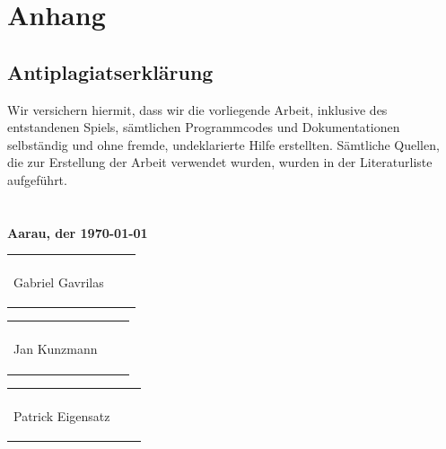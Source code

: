 \documentclass[11pt,a4paper]{scrbook}
\begin{document}
\clearpage
{}
\part{Anhang}
\listoffigures

\clearpage

\printbibliography

\clearpage

\chapter*{Antiplagiatserklärung}
Wir versichern hiermit, dass wir die vorliegende Arbeit, inklusive des entstandenen Spiels, sämtlichen Programmcodes und Dokumentationen
selbständig und ohne fremde, undeklarierte Hilfe erstellten. Sämtliche Quellen, die zur Erstellung
der Arbeit verwendet wurden, wurden in der Literaturliste aufgeführt.
\\\\\\
\textbf{Aarau, der \today}\\

\vspace{1 cm}
\begin{tabular}{p{5cm}p{.5cm}l}
\dotfill \\
\begin{center}
Gabriel Gavrilas

\end{center}\end{tabular}%
\hfill
\begin{tabular}{p{5cm}p{.5cm}l}
\dotfill \\
\begin{center}
Jan Kunzmann

\end{center}\end{tabular}%
\hfill
\begin{tabular}{p{5cm}p{.5cm}l}
\dotfill \\
\begin{center}
Patrick Eigensatz
\end{center}
\end{tabular}%
\\
\end{document}

